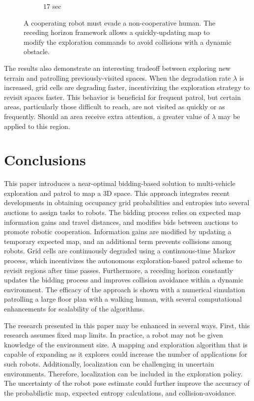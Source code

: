 \documentclass[smallextended]{svjour3}       %
\begin{document}
\begin{figure}[!t]
\begin{subfigure}[t]{0.3\columnwidth}
        		\caption{$17$ sec}
    	\end{subfigure}
	\caption{A cooperating robot must evade a non-cooperative human. The receding horizon framework allows a quickly-updating map to modify the exploration commands to avoid collisions with a dynamic obstacle.}
	\label{fig:EvadeHuman}
\end{figure}

The results also demonstrate an interesting tradeoff between exploring new terrain and patrolling previously-visited spaces. When the degradation rate $\lambda$ is increased, grid cells are degrading faster, incentivizing the exploration strategy to revisit spaces faster. This behavior is beneficial for frequent patrol, but certain areas, particularly those difficult to reach, are not visited as quickly or as frequently. Should an area receive extra attention, a greater value of $\lambda$ may be applied to this region.


\section{Conclusions}
\label{sec:Conclusions}

This paper introduces a near-optimal bidding-based solution to multi-vehicle exploration and patrol to map a 3D space. This approach integrates recent developments in obtaining occupancy grid probabilities and entropies into several auctions to assign tasks to robots. The bidding process relies on expected map information gains and travel distances, and modifies bids between auctions to promote robotic cooperation. Information gains are modified by updating a temporary expected map, and an additional term prevents collisions among robots. Grid cells are continuously degraded using a continuous-time Markov process, which incentivizes the autonomous exploration-based patrol scheme to revisit regions after time passes. Furthermore, a receding horizon constantly updates the bidding process and improves collision avoidance within a dynamic environment. The efficacy of the approach is shown with a numerical simulation patrolling a large floor plan with a walking human, with several computational enhancements for scalability of the algorithms.

The research presented in this paper may be enhanced in several ways. First, this research assumes fixed map limits. In practice, a robot may not be given knowledge of the environment size. A mapping and exploration algorithm that is capable of expanding as it explores could increase the number of applications for such robots. Additionally, localization can be challenging in uncertain environments. Therefore, localization can be included in the exploration policy. The uncertainty of the robot pose estimate could further improve the accuracy of the probabilistic map, expected entropy calculations, and collision-avoidance.
\end{document}
